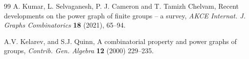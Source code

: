 \documentclass[12pt]{amsart}
\theoremstyle{plain}
\theoremstyle{remark}
\theoremstyle{definition}
\begin{document}
\begin{thebibliography}{99}
A. Kumar, L. Selvaganesh, P. J. Cameron and T. Tamizh Chelvam,
Recent developments on the power graph of finite groups -- a survey,
\textit{AKCE Internat. J. Graphs Combinatorics} \textbf{18} (2021), 65--94.

A.V. Kelarev, and S.J. Quinn, A combinatorial property and power graphs of groups, \textit{Contrib. Gen.
Algebra} \textbf{12} (2000) 229--235.







\end{thebibliography}
\end{document}
